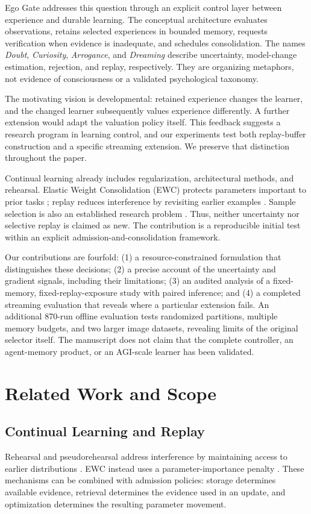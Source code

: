 \documentclass[conference]{IEEEtran}
\begin{document}
Ego Gate addresses this question through an explicit control layer between experience and durable learning. The conceptual architecture evaluates observations, retains selected experiences in bounded memory, requests verification when evidence is inadequate, and schedules consolidation. The names \emph{Doubt}, \emph{Curiosity}, \emph{Arrogance}, and \emph{Dreaming} describe uncertainty, model-change estimation, rejection, and replay, respectively. They are organizing metaphors, not evidence of consciousness or a validated psychological taxonomy.

The motivating vision is developmental: retained experience changes the learner, and the changed learner subsequently values experience differently. A further extension would adapt the valuation policy itself. This feedback suggests a research program in learning control, and our experiments test both replay-buffer construction and a specific streaming extension. We preserve that distinction throughout the paper.

Continual learning already includes regularization, architectural methods, and rehearsal. Elastic Weight Consolidation (EWC) protects parameters important to prior tasks \cite{ewc}; replay reduces interference by revisiting earlier examples \cite{robins}. Sample selection is also an established research problem \cite{gss,mir,gcr,grasp}. Thus, neither uncertainty nor selective replay is claimed as new. The contribution is a reproducible initial test within an explicit admission-and-consolidation framework.

Our contributions are fourfold: (1) a resource-constrained formulation that distinguishes these decisions; (2) a precise account of the uncertainty and gradient signals, including their limitations; (3) an audited analysis of a fixed-memory, fixed-replay-exposure study with paired inference; and (4) a completed streaming evaluation that reveals where a particular extension fails. An additional 870-run offline evaluation tests randomized partitions, multiple memory budgets, and two larger image datasets, revealing limits of the original selector itself. The manuscript does not claim that the complete controller, an agent-memory product, or an AGI-scale learner has been validated.

\section{Related Work and Scope}
\subsection{Continual Learning and Replay}
Rehearsal and pseudorehearsal address interference by maintaining access to earlier distributions \cite{robins}. EWC instead uses a parameter-importance penalty \cite{ewc}. These mechanisms can be combined with admission policies: storage determines available evidence, retrieval determines the evidence used in an update, and optimization determines the resulting parameter movement.
\end{document}
